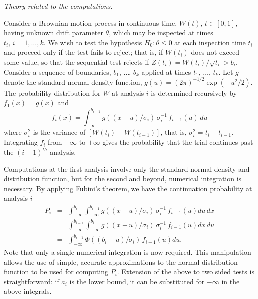 \noindent
{\em Theory related to the computations.}

Consider a Brownian motion process in continuous time, $W(t)$, $t \in [0,1]$,
having unknown drift parameter $\theta$, which may be inspected at times
${t_i, \, i=1,\ldots,k}$.  We wish to test the hypothesis $H_0:
\theta \leq 0$ at each inspection time $t_i$ and proceed only if the test
fails to reject; that is, if $W(t_i)$ does not exceed some value, so that
the sequential test rejects if $Z(t_i) = W(t_i)/\sqrt{t_i} > b_i$.
Consider a sequence of boundaries, $b_1,\,\ldots,\,b_k$ applied at
times $t_1,\,\ldots,\,t_k$.  Let $g$ denote the standard normal density
function,
\begin{math}
 g(u) =
 \left({2\pi}\right)^{-1/2}
 \exp \left( - u^2/2 \right).
\end{math}
The probability distribution for $W$ at analysis $i$ is determined
recursively by
\begin{math}
 f_1(x) = g(x)
\end{math}
and
\begin{displaymath}
 f_i(x) =
 \int_{-\infty}^{b_{i-1}}
  g \left( (x-u)/\sigma_i \right) \,
  \sigma_i^{-1} \, f_{i-1}(u) \, du
\end{displaymath}
where $\sigma^2_i$ is the variance of $[W(t_i)-W(t_{i-1})]$, that is,
$\sigma^2_i = t_i - t_{i-1}$.  Integrating $f_i$ from $- \infty$ to $+
\infty$ gives the probability that the trial continues past the
$(i-1)^{th}$ analysis.

Computations at the first analysis involve only the standard normal density
and distribution function, but for the second and beyond, numerical
integration is necessary.  By applying Fubini's theorem, we have the
continuation probability at analysis $i$
\begin{eqnarray*}
P_i &=&
  \int_{-\infty}^{b_i} \int_{-\infty}^{b_{i-1}}
  g \left( (x-u)/\sigma_i \right) \,
  \sigma_i^{-1} \, f_{i-1}(u) du \, dx \nonumber \\
  &=& \int_{-\infty}^{b_{i-1}} \int_{-\infty}^{b_i}
  g \left( (x-u)/\sigma_i \right) \,
  \sigma_i^{-1} \, f_{i-1}(u) dx \, du \nonumber \\
  &=& \int_{-\infty}^{b_{i-1}}
  \Phi \left( (b_i-u)/\sigma_i \right) \,
  f_{i-1}(u) du.
\end{eqnarray*}
Note that only a single numerical integration is now required.  This
manipulation allows the use of simple, accurate approximations to the
normal distribution function to be used for computing $P_i$.  Extension of
the above to two sided tests is straightforward: if $a_i$ is the lower
bound, it can be substituted for $-\infty$ in the above integrals.

